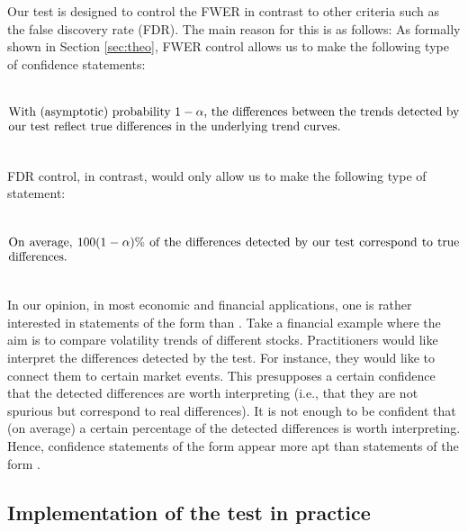 \documentclass[12pt]{article}
\makeatletter
\renewcommand{\eqref}[1]{\tagform@{\ref{#1}}}
\makeatother
\begin{document}
\begin{remark} 
Our test is designed to control the FWER in contrast to other criteria such as the false discovery rate (FDR). The main reason for this is as follows: As formally shown in Section \ref{sec:theo},  FWER control allows us to make the following type of confidence statements:
\begin{equation}\label{eq:CS-FWER}
\begin{minipage}[c][2.25cm][c]{13cm}
With (asymptotic) probability $1-\alpha$, the differences between the trends detected by our test reflect true differences in the underlying trend curves.
\end{minipage}
\end{equation}
FDR control, in contrast, would only allow us to make the following type of statement:
\begin{equation}\label{eq:CS-FDR}
\begin{minipage}[c][2.25cm][c]{13cm}
On average, $100 (1-\alpha) \%$ of the differences detected by our test correspond to true differences.
\end{minipage}
\end{equation}
In our opinion, in most economic and financial applications, one is rather interested in statements of the form \eqref{eq:CS-FWER} than \eqref{eq:CS-FDR}. Take a financial example where the aim is to compare volatility trends of different stocks. Practitioners would like interpret the differences detected by the test. For instance, they would like to connect them to certain market events. This presupposes a certain confidence that the detected differences are worth interpreting (i.e., that they are not spurious but correspond to real differences). It is not enough to be confident that (on average) a certain percentage of the detected differences is worth interpreting. Hence, confidence statements of the form \eqref{eq:CS-FWER} appear more apt than statements of the form \eqref{eq:CS-FDR}.
\end{remark}
  

\subsection{Implementation of the test in practice}\label{subsec:test:impl}
\end{document}

